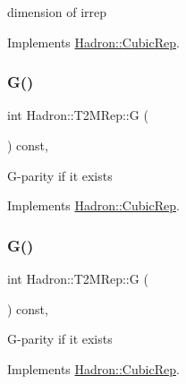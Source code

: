 dimension of irrep 

Implements \mbox{\hyperlink{structHadron_1_1CubicRep_ac178d14064f037a66af4b9fb4b312d51}{Hadron\+::\+Cubic\+Rep}}.

\mbox{\label{structHadron_1_1T2MRep_a1876c1f6b93ff7a6d230f1c8f9678506}} 
\subsubsection{\texorpdfstring{G()}{G()}\hspace{0.1cm}{\footnotesize\ttfamily [1/2]}}
{\footnotesize\ttfamily int Hadron\+::\+T2\+M\+Rep\+::G (\begin{DoxyParamCaption}{ }\end{DoxyParamCaption}) const\hspace{0.3cm}{\ttfamily [inline]}, {\ttfamily [virtual]}}

G-\/parity if it exists 

Implements \mbox{\hyperlink{structHadron_1_1CubicRep_a52104e43266d1614c00bbd1c3b395458}{Hadron\+::\+Cubic\+Rep}}.

\mbox{\label{structHadron_1_1T2MRep_a1876c1f6b93ff7a6d230f1c8f9678506}} 
\subsubsection{\texorpdfstring{G()}{G()}\hspace{0.1cm}{\footnotesize\ttfamily [2/2]}}
{\footnotesize\ttfamily int Hadron\+::\+T2\+M\+Rep\+::G (\begin{DoxyParamCaption}{ }\end{DoxyParamCaption}) const\hspace{0.3cm}{\ttfamily [inline]}, {\ttfamily [virtual]}}

G-\/parity if it exists 

Implements \mbox{\hyperlink{structHadron_1_1CubicRep_a52104e43266d1614c00bbd1c3b395458}{Hadron\+::\+Cubic\+Rep}}.

\mbox{\label{structHadron_1_1T2MRep_a1326313751ae23194da5dcb326ac44a1}} 
